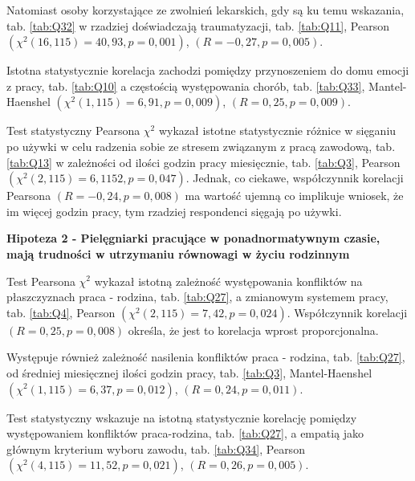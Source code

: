 \documentclass[a4paper,12pt,twoside,openright]{mwrep}
\begin{document}
Natomiast osoby korzystające ze zwolnień lekarskich, gdy są ku temu wskazania, tab. \ref{tab:Q32} w rzadziej doświadczają traumatyzacji, tab. \ref{tab:Q11}, Pearson $(\chi^2 (16, 115) = 40,93, p=0,001)$, $(R = -0,27, p = 0,005)$.


Istotna statystycznie korelacja zachodzi pomiędzy przynoszeniem do domu emocji z pracy, tab. \ref{tab:Q10} a częstością występowania chorób, tab. \ref{tab:Q33}, Mantel-Haenshel $(\chi^2 (1, 115) = 6,91, p=0,009)$, $(R = 0,25, p = 0,009)$.

Test statystyczny Pearsona $\chi^2$ wykazał istotne statystycznie różnice w sięganiu po używki w celu radzenia sobie ze stresem związanym z pracą zawodową, tab. \ref{tab:Q13} w zależności od ilości godzin pracy miesięcznie, tab. \ref{tab:Q3}, Pearson $(\chi^2 (2, 115) = 6,1152, p=0,047)$. Jednak, co ciekawe, współczynnik korelacji Pearsona $(R = -0,24, p = 0,008)$ ma wartość ujemną co implikuje wniosek, że im więcej godzin pracy, tym rzadziej respondenci sięgają po używki.



 
\vspace{\baselineskip} 
\textbf{Hipoteza 2 - Pielęgniarki pracujące w ponadnormatywnym czasie,  mają  trudności w utrzymaniu równowagi w życiu  rodzinnym }
\vspace{\baselineskip} 


	Test Pearsona $\chi^2$ wykazał istotną zależność występowania konfliktów na płaszczyznach praca - rodzina, tab. \ref{tab:Q27}, a zmianowym systemem pracy, tab. \ref{tab:Q4}, Pearson $(\chi^2 (2, 115) = 7,42, p = 0,024)$. Współczynnik korelacji $(R = 0,25, p = 0,008)$ określa, że jest to korelacja wprost proporcjonalna.
	

	Występuje również zależność nasilenia konfliktów praca - rodzina, tab. \ref{tab:Q27}, od średniej miesięcznej ilości godzin pracy, tab. \ref{tab:Q3}, 
Mantel-Haenshel $(\chi^2 (1, 115) = 6,37, p=0,012)$, $(R = 0,24, p = 0,011)$.

	Test statystyczny wskazuje na istotną statystycznie korelację pomiędzy występowaniem konfliktów praca-rodzina, tab. \ref{tab:Q27}, a empatią jako głównym kryterium wyboru zawodu, tab. \ref{tab:Q34}, Pearson $(\chi^2 (4, 115) = 11,52, p=0,021)$, $(R = 0,26, p = 0,005)$.
\end{document}

